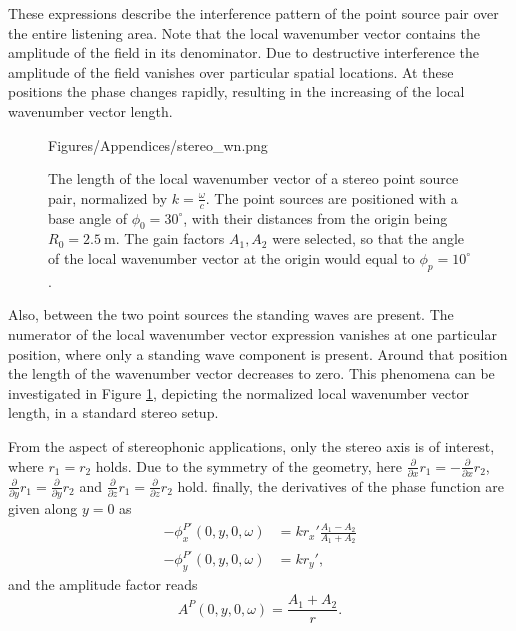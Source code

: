 These expressions describe the interference pattern of the point source pair over the entire listening area.
Note that the local wavenumber vector contains the amplitude of the field in its denominator.
Due to destructive interference the amplitude of the field vanishes over particular spatial locations.
At these positions the phase changes rapidly, resulting in the increasing of the local wavenumber vector length.
%
\begin{figure}
\small
  \begin{minipage}[c]{0.68\textwidth}
	\begin{overpic}[width = .9\columnwidth]{Figures/Appendices/stereo_wn.png}
	\end{overpic}   \end{minipage}\hfill	
	\begin{minipage}[c]{0.3\textwidth}
    \caption{The length of the local wavenumber vector of a stereo point source pair, normalized by $k = \frac{\omega}{c}$.
    The point sources are positioned with a base angle of $\phi_0 = 30^\circ$, with their distances from the origin being $R_0 = 2.5~\mathrm{m}$.
The gain factors $A_1, A_2$ were selected, so that the angle of the local wavenumber vector at the origin would equal to $\phi_p = 10^\circ$. }
\label{fig:App:stereo_wn}   \end{minipage}
\end{figure} 
Also, between the two point sources the standing waves are present.
The numerator of the local wavenumber vector expression vanishes at one particular position, where only a standing wave component is present.
Around that position the length of the wavenumber vector decreases to zero.
This phenomena can be investigated in Figure \ref{fig:App:stereo_wn}, depicting the normalized local wavenumber vector length, in a standard stereo setup.

From the aspect of stereophonic applications, only the stereo axis is of interest, where $r_1 = r_2$ holds.
Due to the symmetry of the geometry, here $\frac{\partial}{\partial x} r_1 = - \frac{\partial}{\partial x} r_2$, $\frac{\partial}{\partial y} r_1 = \frac{\partial}{\partial y} r_2$ and $\frac{\partial}{\partial z} r_1 = \frac{\partial}{\partial z} r_2$ hold. 
finally, the derivatives of the phase function are given along $y = 0$ as
\begin{align}
-\phi^{P'}_x(0,y,0,\omega) &= k r_x' \frac{ A_1  - A_2 
 }{ A_1 + A_2} \\
-\phi^{P'}_y(0,y,0,\omega) &= k r_y',
\end{align}
and the amplitude factor reads
\begin{equation}
A^P(0,y,0,\omega) = \frac{A_1 +  A_2}{r}.
\label{Eq:AppB:stereo_amplitude}
\end{equation}